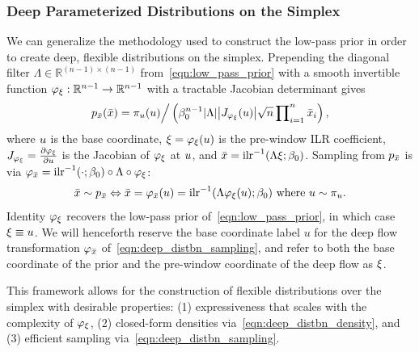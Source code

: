 \subsubsection{Deep Parameterized Distributions on the Simplex}\label{subsubsec:deep_distributions}

We can generalize the methodology used to construct the low-pass prior in order to create deep, flexible distributions on the simplex.
Prepending the diagonal filter $\Lambda \in \mathbb{R}^{(n-1)\times(n-1)}$ from~\eqref{eqn:low_pass_prior} with a smooth invertible function $\varphi_{\xi}:\mathbb{R}^{n-1}\to\mathbb{R}^{n-1}$ with a tractable Jacobian determinant gives
\begin{align}\label{eqn:deep_distbn_density}
    p_{\bar{\distbn}}(\bar{\distbn}) = \pi_{\vv{u}}(\vv{u}) \Big/ \left({\beta_{0}^{n-1} |\Lambda| \AbsDet{J_{\varphi_{\vv{\xi}}}(\vv{u})} \sqrt{n} \prod\nolimits_{i=1}^{n}\bar{\distbn}_{i}}\right),
\end{align}
where $u$ is the base coordinate,
$\xi = \varphi_{\xi}(u)$ is the pre-window \gls*{ILR} coefficient,
$J_{\varphi_{\xi}} = \frac{\partial \varphi_{\xi}}{\partial u}$ is the Jacobian of $\varphi_{\xi}$ at $u$,
and $\bar{\distbn} = \InvILR{\Lambda \vv{\xi}; \beta_{0}}$.
Sampling from $p_{\bar{x}}$ is via $\varphi_{\bar{\distbn}} = \InvILR{\cdot; \beta_{0}} \circ \Lambda \circ \varphi_{\vv{\xi}}$:
\begin{align}\label{eqn:deep_distbn_sampling}
    \bar{\distbn} \sim p_{\bar{\distbn}}
    \Leftrightarrow
    \bar{\distbn} = \varphi_{\bar{\distbn}}(\vv{u}) = \InvILR{\Lambda \varphi_{\vv{\xi}}(\vv{u}); \beta_{0}}
    \text{ where }
    \vv{u} \sim \pi_{\vv{u}}.
\end{align}
Identity $\varphi_{\xi}$ recovers the low-pass prior of~\eqref{eqn:low_pass_prior}, in which case $\xi \equiv u$.
We will henceforth reserve the base coordinate label $u$ for the deep flow transformation $\varphi_{\bar{x}}$ of~\cref{eqn:deep_distbn_sampling}, and refer to both the base coordinate of the prior and the pre-window coordinate of the deep flow as $\xi$.

This framework allows for the construction of flexible distributions over the simplex with desirable properties:
(1) expressiveness that scales with the complexity of $\varphi_{\xi}$,
(2) closed-form densities via~\eqref{eqn:deep_distbn_density}, and
(3) efficient sampling via~\eqref{eqn:deep_distbn_sampling}.

